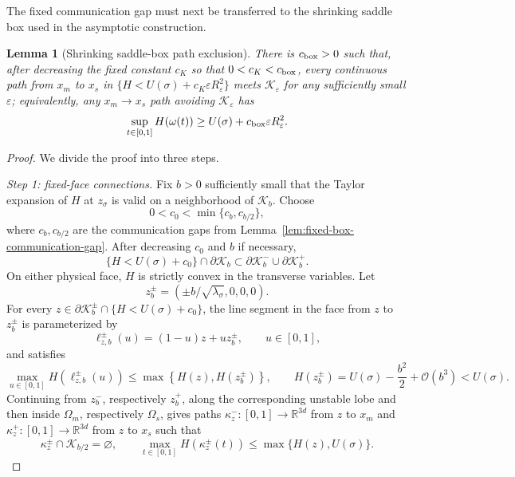 \documentclass[11pt]{article}
\numberwithin{equation}{section}
\theoremstyle{plain}
\newtheorem{lemma}[theorem]{Lemma}
\theoremstyle{definition}
\theoremstyle{remark}
\newcommand{\R}{\mathbb R}
\newcommand{\eps}{\varepsilon}
\begin{document}
The fixed communication gap must next be transferred to the
shrinking saddle box used in the asymptotic construction.

\begin{lemma}[Shrinking saddle-box path exclusion]
\label{lem:path-exclusion-saddle-box}
There is $c_{\rm box}>0$ such that, after decreasing the fixed constant
$c_K$ so that $0<c_K<c_{\rm box}$, every continuous path
from $x_m$ to $x_s$ in $\{H<U(\sigma)+c_K\eps R_\eps^2\}$ meets $\mathcal K_\eps$
for any sufficiently small $\eps$; equivalently, any $x_m\to x_s$ path avoiding
$\mathcal K_\eps$ has
\[
\sup_{t\in[0,1]}H(\omega(t))\ge
U(\sigma)+c_{\rm box}\eps R_\eps^2.
\]
\end{lemma}

\begin{proof}
We divide the proof into three steps.

\emph{Step 1: fixed-face connections.}
Fix $b>0$ sufficiently small that the Taylor expansion of $H$ at
$z_\sigma$ is valid on a neighborhood of $\mathcal K_b$.  Choose
\[
0<c_0<\min\{c_b,c_{b/2}\},
\]
where $c_b,c_{b/2}$ are the communication gaps from
Lemma~\ref{lem:fixed-box-communication-gap}.  After decreasing $c_0$ and
$b$ if necessary,
\begin{equation}
\label{eq:fixed-box-low-boundary-faces}
\{H<U(\sigma)+c_0\}\cap\partial\mathcal K_b
\subset
\partial\mathcal K_b^-\cup\partial\mathcal K_b^+.
\end{equation}
On either physical face, $H$ is strictly convex in the transverse variables.
Let
\[
z_b^\pm
=\left(\pm b/\sqrt{\lambda_\sigma},0,0,0\right).
\]
For every
$z\in\partial\mathcal K_b^\pm\cap\{H<U(\sigma)+c_0\}$, the line segment
in the face from $z$ to $z_b^\pm$ is parameterized by
\[
\ell_{z,b}^\pm(u)=(1-u)z+uz_b^\pm,
\qquad u\in[0,1],
\]
and satisfies
\begin{equation}
\label{eq:fixed-face-segment-energy}
\max_{u\in[0,1]}H\left(\ell_{z,b}^\pm(u)\right)
\le\max\left\{H(z),H\left(z_b^\pm\right)\right\},
\qquad
H\left(z_b^\pm\right)
=U(\sigma)-\frac{b^2}{2}+\mathcal O(b^3)<U(\sigma).
\end{equation}
Continuing from $z_b^-$, respectively $z_b^+$, along the corresponding
unstable lobe and then inside $\Omega_m$, respectively $\Omega_s$, gives paths
$\kappa_z^-:[0,1]\to\R^{3d}$ from $z$ to $x_m$ and
$\kappa_z^+:[0,1]\to\R^{3d}$ from $z$ to $x_s$ such that
\begin{equation}
\label{eq:fixed-face-well-connection}
\kappa_z^\pm\cap\mathcal K_{b/2}=\varnothing,
\qquad
\max_{t\in[0,1]} H\left(\kappa_z^\pm(t)\right)
\le\max\{H(z),U(\sigma)\}.
\end{equation}


\end{proof}
\end{document}
